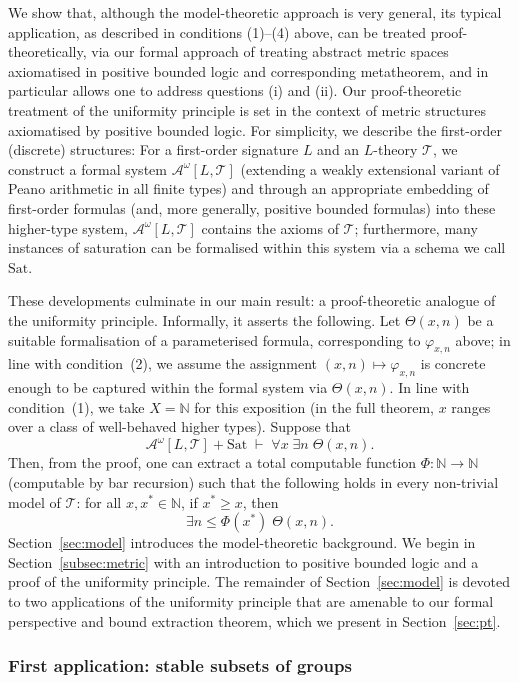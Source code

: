 \documentclass[11pt]{amsart}
\theoremstyle{definition}
\theoremstyle{remark}
\def\NN{\mathbb{N}}
\begin{document}
We show that, although the model-theoretic approach is very general, its typical application, as described in conditions (1)--(4) above, can be treated proof-theoretically, via our formal approach of treating abstract metric spaces axiomatised in positive bounded logic and corresponding metatheorem, and in particular allows one to address questions (i) and (ii). Our proof-theoretic treatment of the uniformity principle is set in the context of metric structures axiomatised by positive bounded logic. For simplicity, we describe the first-order (discrete) structures: For a first-order signature $L$ and an $L$-theory $\mathcal{T}$, we construct a formal system $\mathcal{A}^\omega[L,\mathcal{T}]$ (extending a weakly extensional variant of Peano arithmetic in all finite types) and through an appropriate embedding of first-order formulas (and, more generally, positive bounded formulas) into these higher-type system, $\mathcal{A}^\omega[L,\mathcal{T}]$ contains the axioms of $\mathcal{T}$; furthermore, many instances of saturation can be formalised within this system via a schema we call $\mathrm{Sat}$.

These developments culminate in our main result: a proof-theoretic analogue of the uniformity principle. Informally, it asserts the following. Let $\Theta(x,n)$ be a suitable formalisation of a parameterised formula, corresponding to $\varphi_{x,n}$ above; in line with condition~(2), we assume
the assignment $(x,n)\mapsto\varphi_{x,n}$ is concrete enough to be captured within the formal system via $\Theta(x,n)$. In line with condition~(1), we take $X = \NN$ for this exposition (in the full theorem, $x$ ranges over a class of well-behaved higher types). Suppose that
\[
  \mathcal{A}^\omega[L,\mathcal{T}] + \mathrm{Sat}
  \;\vdash\;
  \forall x\;\exists n\;\Theta(x,n).
\]
Then, from the proof, one can extract a total computable function $\Phi\colon\NN\to\NN$ (computable by bar recursion) such that the following holds in every non-trivial model of $\mathcal{T}$: for all $x, x^{*}\in\NN$, if $x^{*} \geq x$, then
\[
  \exists n \leq \Phi(x^{*})\;\Theta(x,n).
\]
Section~\ref{sec:model} introduces the model-theoretic background. We begin in Section~\ref{subsec:metric} with an introduction to positive bounded logic and a proof of the uniformity principle. The remainder of Section~\ref{sec:model} is devoted to two applications of the uniformity
principle that are amenable to our formal perspective and bound extraction theorem, which we present in Section~\ref{sec:pt}.

\subsubsection*{First application: stable subsets of groups}
\end{document}
